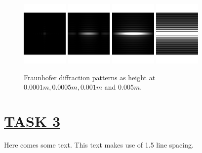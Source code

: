 \documentclass[fontsize=11pt]{scrartcl}
\begin{document}
\begin{figure}[H]
    \centering
     \includegraphics[width=0.20\textwidth]{img/2_0.bmp.pdf}
     \includegraphics[width=0.20\textwidth]{img/2_1.bmp.pdf}
     \includegraphics[width=0.20\textwidth]{img/2_2.bmp.pdf}
     \includegraphics[width=0.20\textwidth]{img/2_3.bmp.pdf}
     \caption{Fraunhofer diffraction patterns as height at $0.0001m, 0.0005m, 0.001m$ and $0.005m$.}
     \label{fig2.1}
\end{figure}

\pagebreak
\section{\uline{TASK 3}}
Here comes some text. This text makes use of 1.5 line spacing. 
\end{document}
